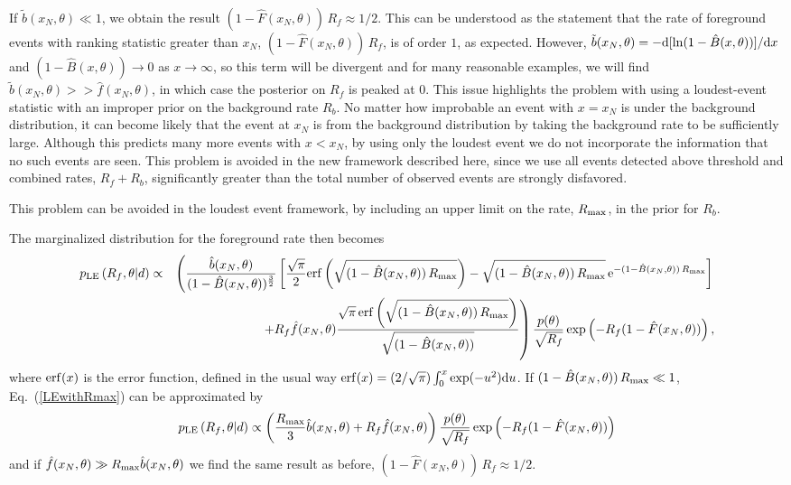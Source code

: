 \documentclass[aps,prd,reprint,nofootinbib]{revtex4-1}
\begin{document}
If $\tilde{b}(x_N,\theta) \ll 1$, we obtain the result $(1-
\hat{F}(x_N,\theta))\,R_f \approx 1/2$. This can be understood as the
statement that the rate of foreground events with ranking statistic
greater than $x_N$, $(1- \hat{F}(x_N,\theta))\,R_f$, is of order $1$,
as expected. However, $\tilde{b}(x_N,\theta) = -{\rm d}
[\ln(1-\hat{B}(x,\theta))]/{\rm d}x$ and $(1-\hat{B}(x,\theta))
\rightarrow 0$ as $x \rightarrow \infty$, so this term will be
divergent and for many reasonable examples, we will find
$\tilde{b}(x_N,\theta) >> \hat{f}(x_N,\theta)$, in which case the
posterior on $R_f$ is peaked at $0$. This issue highlights the problem
with using a loudest-event statistic with an improper prior on the
background rate $R_b$. No matter how improbable an event with $x=x_N$
is under the background distribution, it can become likely that the
event at $x_N$ is from the background distribution by taking the
background rate to be sufficiently large. Although this predicts many
more events with $x < x_N$, by using only the loudest event we do not
incorporate the information that no such events are seen. This problem
is avoided in the new framework described here, since we use all
events detected above threshold and combined rates, $R_f+R_b$,
significantly greater than the total number of observed events are
strongly disfavored.

This problem can be avoided in the loudest event framework, by
including an upper limit on the rate, $R_{\rm max}$, in the prior for
$R_b$. 
\begin{widetext}
The marginalized distribution for the foreground rate then becomes
\begin{eqnarray}
p_{\rm LE}\left( R_f, \theta | d \right) &\propto& \left(
\frac{\hat{b}(x_N,\theta)}{(1-\hat{B}(x_N,\theta))^{\frac{3}{2}}}
\left[\frac{\sqrt{\pi}}{2}{\rm
    erf}\left(\sqrt{(1-\hat{B}(x_N,\theta))\,R_{\rm max}}\right) -
  \sqrt{(1-\hat{B}(x_N,\theta))\,R_{\rm max}} \, {\rm
    e}^{-(1-\hat{B}(x_N,\theta)) \, R_{\rm max}}\right]
\right. \nonumber \\ && \left.+ R_f
\hat{f}(x_N,\theta)\frac{\sqrt{\pi}\,{\rm
    erf}\left(\sqrt{(1-\hat{B}(x_N,\theta))\,R_{\rm
      max}}\right)}{\sqrt{(1-\hat{B}(x_N,\theta))}}\right)\frac{p(\theta)}{\sqrt{R_f}}
\exp\left(-R_f(1-\hat{F}(x_N,\theta))\right) \label{LEwithRmax},
\end{eqnarray}
where ${\rm erf}(x)$ is the error function, defined in the usual way
${\rm erf}(x) = (2/\sqrt{\pi}) \int_0^x \exp(-u^2){\rm d}u$. If
$(1-\hat{B}(x_N,\theta)) \, R_{\rm max} \ll 1$, Eq.~(\ref{LEwithRmax})
can be approximated by
\begin{equation}
p_{\rm LE}\left( R_f, \theta | d \right) \propto \left( \frac{R_{\rm
    max}}{3} \hat{b}(x_N,\theta) + R_f
\hat{f}(x_N,\theta)\right)\frac{p(\theta)}{\sqrt{R_f}}
\exp\left(-R_f(1-\hat{F}(x_N,\theta))\right)
\end{equation}
and if $\hat{f}(x_N,\theta) \gg R_{\rm max} \hat{b}(x_N,\theta)$ we
find the same result as before, $(1- \hat{F}(x_N,\theta))\,R_f \approx
1/2$.
\end{widetext}
\end{document}
